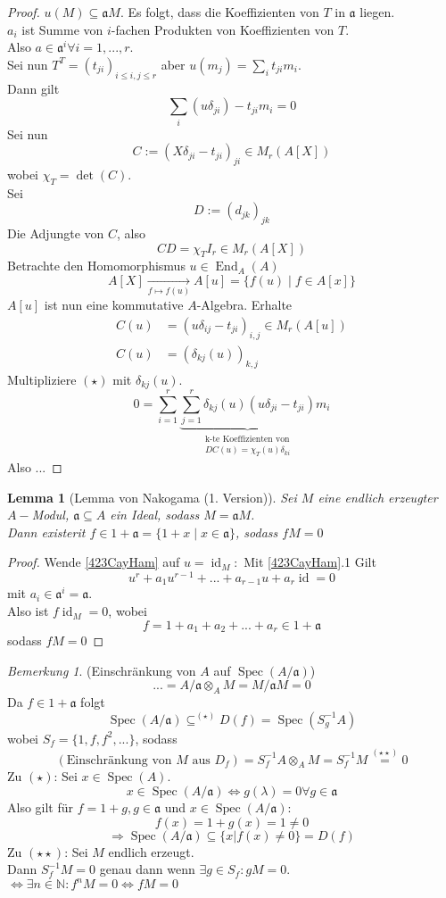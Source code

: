 \documentclass[10pt,a4paper]{article}
\newcommand{\N}{\ensuremath{\mathbb{N}}}
\newcommand{\la}{\ensuremath{\lambda}}
\newcommand{\End}{\operatorname{End}}
\newcommand{\Spec}{\ensuremath{\operatorname{Spec}}}
\newcommand{\id}{\operatorname{id}}
\newcounter{thm}[section]
\theoremstyle{definition}
\theoremstyle{plain}
\newtheorem{lem}[thm]{Lemma}
\theoremstyle{remark}
\newtheorem{bem}[thm]{Bemerkung}
\begin{document}
\begin{proof}
	$u(M)\subseteq\mathfrak aM$. Es folgt, dass die Koeffizienten von $T$ in $\mathfrak a$ liegen.\\
	$a_i$ ist Summe von $i$-fachen Produkten von Koeffizienten von $T$.\\
	Also $a\in\mathfrak a^i\forall i=1,...,r$.\\
	Sei nun $T^T=(t_{ji})_{i\le i,j\le r}$ aber $u(m_j)=\sum_{i}t_{ji}m_i$.\\
	Dann gilt
	\[\sum_i(u\delta_{ji})-t_{ji}m_i=0\]
	Sei nun
	\[C:=(X\delta_{ji}-t_{ji})_{ji}\in M_r(A[X])\]
	wobei $\chi_T=\det(C)$.\\
	Sei
	\[D:=(d_{jk})_{jk}\]
	Die Adjungte von $C$, also
	\[CD=\chi_TI_r\in M_r(A[X])\tag{$\star\star$}\]
	Betrachte den Homomorphismus $u\in\End_A(A)$
	\[A[X]\xrightarrow[f\mapsto f(u)]{}A[u]=\{f(u)\mid f\in A[x] \}\]
	$A[u]$ ist nun eine kommutative $A$-Algebra. Erhalte
	\begin{align*}
	C(u)&=(u\delta_{ij}-t_{ji})_{i,j}\in M_r(A[u])\\
	C(u)&=(\delta_{kj}(u))_{k,j}
	\end{align*}
	Multipliziere $(\star)$ mit $\delta_{kj}(u)$.
	\[0=\sum_{i=1}^{r}\underbrace{\sum_{j=1}^{r}\delta_{kj}(u)(u\delta_{ji}-t_{ji})}_{\substack{\text{k-te Koeffizienten von}\\DC(u)=\chi_T(u)\delta_{ki}}}m_i\]
	Also ...
\end{proof}
\begin{lem}[Lemma von Nakogama (1. Version)]
	\label{424Nakayana1}
	Sei $M$ eine endlich erzeugter $A-$Modul, $\mathfrak a\subseteq A$ ein Ideal, sodass $M=\mathfrak aM$.\\
	Dann existerit $f\in1+\mathfrak a=\{1+x\mid x\in \mathfrak a\}$, sodass $fM=0$
\end{lem}
\begin{proof}
	Wende \ref{423CayHam} auf $u=\id_M:$
	Mit \ref{423CayHam}.1 Gilt
	\[u^r+a_1u^{r-1}+...+a_{r-1}u+a_r\id=0\]
	mit $a_i\in\mathfrak a^i=\mathfrak a$.\\
	Also ist $f\id_M=0$, wobei
	\[f=1+a_1+a_2+...+a_r\in 1+\mathfrak a\]
	sodass $fM=0$
\end{proof}
\begin{bem}
	(Einschränkung von $A$ auf $\Spec(A/\mathfrak a)$)
	\[...=A/\mathfrak a\otimes_AM=M/\mathfrak aM=0\]
	Da $f\in 1+\mathfrak a$ folgt
	\[\Spec(A/\mathfrak a)\subseteq^{(\star)}D(f)=\Spec(S_{g}^{-1}A)\]
	wobei $S_f=\{1,f,f^2,...\}$, sodass
	\[(\text{Einschränkung von $M$ aus $D_f$})=S_f^{-1}A\otimes_AM=S_f^{-1}M\overset{(\star\star)}{=}0\]
	Zu $(\star)$: Sei $x\in\Spec(A)$.
	\[x\in\Spec(A/\mathfrak a)\Leftrightarrow g(\la)=0\forall g\in\mathfrak a \]
	Also gilt für $f=1+g,g\in\mathfrak a$ und $x\in\Spec(A/\mathfrak a)$:
	\[f(x)=1+g(x)=1\neq 0\]
	\[\Rightarrow \Spec(A/\mathfrak a)\subseteq \{x|f(x)\neq 0\}=D(f)\]
	Zu $(\star\star)$: Sei $M$ endlich erzeugt.\\
	Dann $S^{-1}_fM=0$ genau dann wenn $\exists g\in S_f:gM=0$.\\
	$\Leftrightarrow \exists n\in \N: f^nM=0\Leftrightarrow fM=0$
\end{bem}
\end{document}
